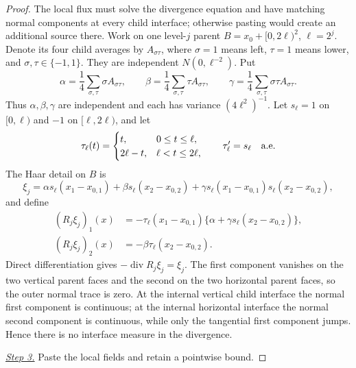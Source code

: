 \documentclass{aomart}
\theoremstyle{definition}
\newcommand{\1}{\mathbf 1}
\begin{document}
\begin{proof}
The local flux must solve the divergence equation and have matching
normal components at every child interface; otherwise pasting would
create an additional source there.  Work on one level-$j$ parent
$B=x_ 0+[0,2\ell)^2$, $\ell=2^j$.  Denote its four child averages by
$A_ {\sigma\tau}$, where $\sigma=1$ means left, $\tau=1$ means lower,
and $\sigma,\tau\in\{-1,1\}$.  They are independent
$N(0,\ell^{-2})$.  Put
\begin{equation*}
\alpha=\frac14\sum_ {\sigma,\tau}\sigma A_ {\sigma\tau},\qquad
\beta =\frac14\sum_ {\sigma,\tau}\tau A_ {\sigma\tau},\qquad
\gamma=\frac14\sum_ {\sigma,\tau}\sigma\tau A_ {\sigma\tau}.
\end{equation*}
Thus $\alpha,\beta,\gamma$ are independent and each has variance
$(4\ell^2)^{-1}$.  Let $s_ \ell=1$ on $[0,\ell)$ and $-1$ on
$[\ell,2\ell)$, and let
\begin{equation*}
\tau_ \ell(t)=\begin{cases}t,&0\leq t\leq\ell,\\
2\ell-t,&\ell<t\leq2\ell,
\end{cases}
\qquad \tau_ \ell'=s_ \ell\quad\hbox{a.e.}
\end{equation*}
The Haar detail on $B$ is
\begin{equation*}
\xi_ j=\alpha s_ \ell(x_ 1-x_ {0,1})+\beta s_ \ell(x_ 2-x_ {0,2})
+\gamma s_ \ell(x_ 1-x_ {0,1})s_ \ell(x_ 2-x_ {0,2}),
\end{equation*}
and define
\begin{equation}
\begin{split}
(R_ j\xi_ j)_ 1(x)&=-\tau_ \ell(x_ 1-x_ {0,1})
\{\alpha+\gamma s_ \ell(x_ 2-x_ {0,2})\},\\
(R_ j\xi_ j)_ 2(x)&=-\beta\tau_ \ell(x_ 2-x_ {0,2}).
\end{split}
\tag{12a}
\end{equation}
Direct differentiation gives $-\operatorname {div}R_ j\xi_ j=\xi_ j$.
The first component vanishes on the two vertical parent faces and the
second on the two horizontal parent faces, so the outer normal trace is
zero.  At the internal vertical child interface the normal first
component is continuous; at the internal horizontal interface the normal
second component is continuous, while only the tangential first component
jumps.  Hence there is no interface measure in the divergence.

\smallskip\noindent
\underline{\textit{Step 3.}} Paste the local fields and retain a pointwise bound.


\end{proof}
\end{document}
